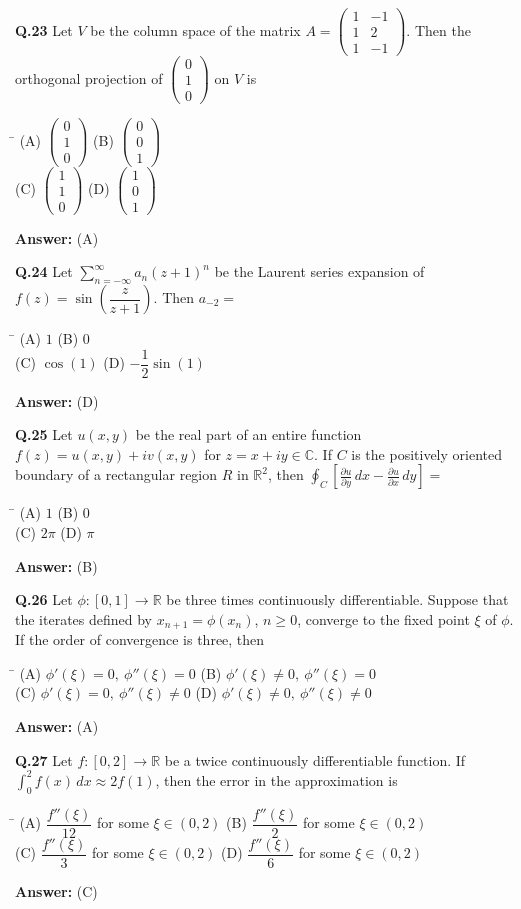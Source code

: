 \documentclass[11pt,a4paper]{article}
\newcommand{\optsfourA}[4]{%
  \begin{tabbing}
    \hspace{0.48\linewidth}\=\kill
    (A) #1 \> (B) #2 \\[2pt]
    (C) #3 \> (D) #4
  \end{tabbing}%
}
\newcommand{\ans}[1]{\textbf{Answer:} #1\par\medskip}
\begin{document}
\textbf{Q.23} Let $V$ be the column space of the matrix $A = \begin{pmatrix} 1 & -1 \\ 1 & 2 \\ 1 & -1 \end{pmatrix}$. Then the orthogonal projection of $\begin{pmatrix} 0 \\ 1 \\ 0 \end{pmatrix}$ on $V$ is
\optsfourA{$\begin{pmatrix} 0 \\ 1 \\ 0 \end{pmatrix}$}{$\begin{pmatrix} 0 \\ 0 \\ 1 \end{pmatrix}$}{$\begin{pmatrix} 1 \\ 1 \\ 0 \end{pmatrix}$}{$\begin{pmatrix} 1 \\ 0 \\ 1 \end{pmatrix}$}
\ans{(A)}

\textbf{Q.24} Let $\displaystyle\sum_{n=-\infty}^{\infty} a_n (z + 1)^n$ be the Laurent series expansion of $f(z) = \sin\!\left(\dfrac{z}{z + 1}\right)$. Then $a_{-2} =$
\optsfourA{$1$}{$0$}{$\cos(1)$}{$-\dfrac{1}{2}\sin(1)$}
\ans{(D)}

\textbf{Q.25} Let $u(x,y)$ be the real part of an entire function $f(z) = u(x,y) + i v(x,y)$ for $z = x + iy \in \mathbb{C}$. If $C$ is the positively oriented boundary of a rectangular region $R$ in $\mathbb{R}^2$, then $\displaystyle\oint_C \left[\frac{\partial u}{\partial y}\,dx - \frac{\partial u}{\partial x}\,dy\right] =$
\optsfourA{$1$}{$0$}{$2\pi$}{$\pi$}
\ans{(B)}

\textbf{Q.26} Let $\phi : [0, 1] \to \mathbb{R}$ be three times continuously differentiable. Suppose that the iterates defined by $x_{n+1} = \phi(x_n)$, $n \ge 0$, converge to the fixed point $\xi$ of $\phi$. If the order of convergence is three, then
\optsfourA{$\phi'(\xi) = 0,\ \phi''(\xi) = 0$}{$\phi'(\xi) \ne 0,\ \phi''(\xi) = 0$}{$\phi'(\xi) = 0,\ \phi''(\xi) \ne 0$}{$\phi'(\xi) \ne 0,\ \phi''(\xi) \ne 0$}
\ans{(A)}

\textbf{Q.27} Let $f : [0, 2] \to \mathbb{R}$ be a twice continuously differentiable function. If $\displaystyle\int_0^2 f(x)\,dx \approx 2f(1)$, then the error in the approximation is
\optsfourA{$\dfrac{f''(\xi)}{12}$ for some $\xi \in (0, 2)$}{$\dfrac{f''(\xi)}{2}$ for some $\xi \in (0, 2)$}{$\dfrac{f''(\xi)}{3}$ for some $\xi \in (0, 2)$}{$\dfrac{f''(\xi)}{6}$ for some $\xi \in (0, 2)$}
\ans{(C)}
\end{document}
